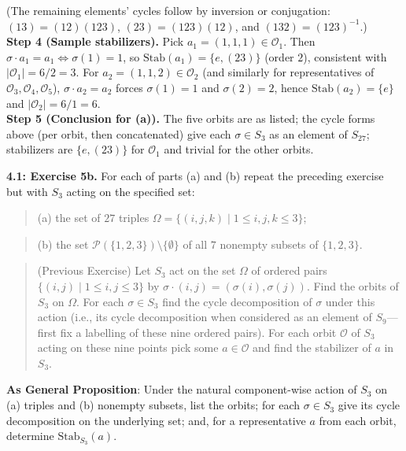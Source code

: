 \documentclass[11pt]{article}
\theoremstyle{definition}
\begin{document}
(The remaining elements’ cycles follow by inversion or conjugation: $(13)=(12)(123)$, $(23)=(123)(12)$, and $(132)=(123)^{-1}$.)\\
\textbf{Step 4 (Sample stabilizers).} Pick $a_1=(1,1,1)\in\mathcal O_1$. Then $\sigma\cdot a_1=a_1\iff\sigma(1)=1$, so $\mathrm{Stab}(a_1)=\{e,(23)\}$ (order $2$), consistent with $|\mathcal O_1|=6/2=3$. For $a_2=(1,1,2)\in\mathcal O_2$ (and similarly for representatives of $\mathcal O_3,\mathcal O_4,\mathcal O_5$), $\sigma\cdot a_2=a_2$ forces $\sigma(1)=1$ and $\sigma(2)=2$, hence $\mathrm{Stab}(a_2)=\{e\}$ and $|\mathcal O_2|=6/1=6$.\\
\textbf{Step 5 (Conclusion for (a)).} The five orbits are as listed; the cycle forms above (per orbit, then concatenated) give each $\sigma\in S_3$ as an element of $S_{27}$; stabilizers are $\{e,(23)\}$ for $\mathcal O_1$ and trivial for the other orbits.\\

\newpage

\noindent \textbf{4.1: Exercise 5b.} For each of parts (a) and (b) repeat the preceding exercise but with $S_3$ acting on the specified set:\\

\begin{quote}
(a) the set of $27$ triples $\Omega=\{(i,j,k)\mid 1\le i,j,k\le 3\}$;
\end{quote}

\begin{quote}
(b) the set $\mathcal P(\{1,2,3\})\setminus\{\emptyset\}$ of all $7$ nonempty subsets of $\{1,2,3\}$.
\end{quote} %

\begin{quote} 

(Previous Exercise) Let $S_3$ act on the set $\Omega$ of ordered pairs $\{(i,j)\mid 1\le i,j\le 3\}$ by $\sigma\!\cdot\!(i,j)=(\sigma(i),\sigma(j))$. Find the orbits of $S_3$ on $\Omega$. For each $\sigma\in S_3$ find the cycle decomposition of $\sigma$ under this action (i.e., its cycle decomposition when considered as an element of $S_9$—first fix a labelling of these nine ordered pairs). For each orbit $\mathcal O$ of $S_3$ acting on these nine points pick some $a\in\mathcal O$ and find the stabilizer of $a$ in $S_3$.\\ %

\end{quote}

\noindent\textbf{As General Proposition}: Under the natural component-wise action of $S_3$ on (a) triples and (b) nonempty subsets, list the orbits; for each $\sigma\in S_3$ give its cycle decomposition on the underlying set; and, for a representative $a$ from each orbit, determine $\mathrm{Stab}_{S_3}(a)$.\\
\end{document}
